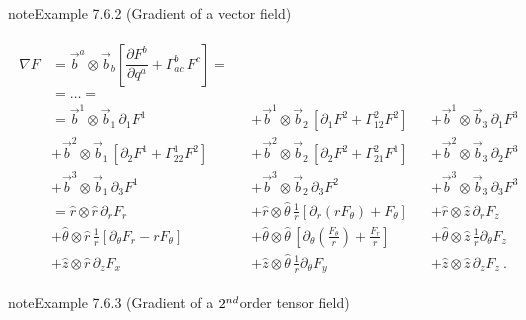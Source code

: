 \documentclass[letterpaper,10pt,english]{jupyterBook}
\begin{document}
\begin{sphinxadmonition}{note}{Example 7.6.2 (Gradient of a vector field)}




\begin{equation*}
\begin{split}\begin{aligned}
  \nabla F 
  & = \vec{b}^a \otimes \vec{b}_b \left[ \dfrac{\partial F^b}{\partial q^a} + \Gamma_{ac}^b \, F^c \right] = \\
  & = \dots = \\
  & =  \vec{b}^1 \otimes \vec{b}_1 \, \partial_1 F^1 
  && + \vec{b}^1 \otimes \vec{b}_2 \, \left[ \partial_1 F^2 + \Gamma_{12}^2 F^2 \right]
  && + \vec{b}^1 \otimes \vec{b}_3 \, \partial_1 F^3 \\
  &  + \vec{b}^2 \otimes \vec{b}_1 \, \left[ \partial_2 F^1 + \Gamma_{22}^1 F^2 \right]
  && + \vec{b}^2 \otimes \vec{b}_2 \, \left[ \partial_2 F^2 + \Gamma_{21}^2 F^1 \right]
  && + \vec{b}^2 \otimes \vec{b}_3 \, \partial_2 F^3 \\
  &  + \vec{b}^3 \otimes \vec{b}_1 \, \partial_3 F^1 
  && + \vec{b}^3 \otimes \vec{b}_2 \, \partial_3 F^2 
  && + \vec{b}^3 \otimes \vec{b}_3 \, \partial_3 F^3 \\
  &  = \hat{r     } \otimes \hat{r     } \, \partial_r F_r   
  && + \hat{r     } \otimes \hat{\theta} \, \frac{1}{r} \left[ \partial_r (r F_{\theta}) + F_{\theta} \right]
  && + \hat{r     } \otimes \hat{z     } \, \partial_r F_z \\
  &  + \hat{\theta} \otimes \hat{r     } \, \frac{1}{r} \left[ \partial_\theta F_r - r F_{\theta} \right]
  && + \hat{\theta} \otimes \hat{\theta} \, \left[ \partial_\theta \left( \frac{F_\theta}{r} \right) + \frac{F_r}{r} \right]
  && + \hat{\theta} \otimes \hat{z     } \, \frac{1}{r} \partial_{\theta} F_z \\
  &  + \hat{z     } \otimes \hat{r     } \, \partial_z F_x   
  && + \hat{z     } \otimes \hat{\theta} \, \frac{1}{r} \partial_\theta F_y   
  && + \hat{z     } \otimes \hat{z     } \, \partial_z F_z \ .
\end{aligned}\end{split}
\end{equation*}\end{sphinxadmonition}
\label{ch/tensor-algebra-calculus/calculus-euclidean-cylindrical:example-2}
\begin{sphinxadmonition}{note}{Example 7.6.3 (Gradient of a \protect\(2^{nd}\protect\)\sphinxhyphen{}order tensor field)}


\end{sphinxadmonition}
\end{document}
